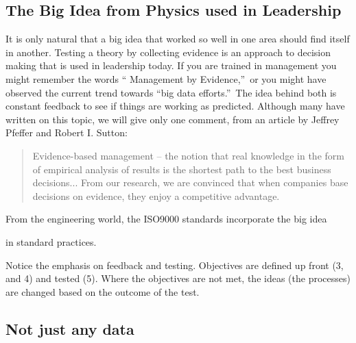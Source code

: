 \documentclass{article}
\begin{document}
\subsection{The Big Idea from Physics used in Leadership}

It is only natural that a big idea that worked so well in one area should
find itself in another. Testing a theory by collecting evidence is an
approach to decision making that is used in leadership today. If you are
trained in management you might remember the words \textquotedblleft
Management by Evidence,\textquotedblright\ or you might have observed the
current trend towards \textquotedblleft big data efforts.\textquotedblright\
The idea behind both is constant feedback to see if things are working as
predicted. Although many have written on this topic, we will give only one
comment, from an article by Jeffrey Pfeffer and Robert I. Sutton:

\begin{quotation}
Evidence-based management -- the notion that real knowledge in the form of
empirical analysis of results is the shortest path to the best business
decisions... From our research, we are convinced that when companies base
decisions on evidence, they enjoy a competitive advantage. \cite%
{PfefferandSutton}
\end{quotation}

From the engineering world, the ISO9000 standards incorporate the big idea

in standard practices.\cite{Hooper}


Notice the emphasis on feedback and testing. Objectives are defined up front
(3, and 4) and tested (5). Where the objectives are not met, the ideas (the
processes) are changed based on the outcome of the test.

\subsection{Not just any data}
\end{document}
